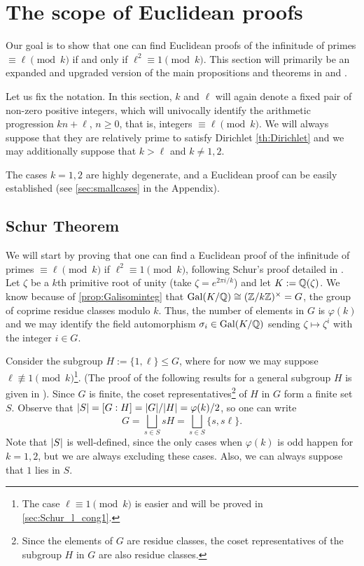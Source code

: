 \documentclass[../main.tex]{subfiles}
\begin{document}
\section{The scope of Euclidean proofs}\label{sec:theoretical}

Our goal is to show that one can find Euclidean proofs of the infinitude of primes $\equiv\ell\pmod{k}$ if and only if $\ell^2\equiv 1 \pmod{k}$. This section will primarily be an expanded and upgraded version of the main propositions and theorems in \cite{Murty} and \cite{Conrad}.

Let us fix the notation. In this section, $k$ and $\ell$ will again denote a fixed pair of non-zero positive integers, which will univocally identify the arithmetic progression $kn+\ell$, $n\geqslant 0$, that is, integers $\equiv \ell\pmod{k}$. We will always suppose that they are relatively prime to satisfy Dirichlet \cref{th:Dirichlet} and we may additionally suppose that $k > \ell$ and $k\neq 1,2$.

\begin{remark}
	The cases $k=1,2$ are highly degenerate, and a Euclidean proof can be easily established (see \cref{sec:smallcases} in the Appendix).
\end{remark}

\subsection{Schur Theorem}\label{sec:SchurTh}

We will start by proving that one can find a Euclidean proof of the infinitude of primes $\equiv \ell\pmod{k}$ if $\ell^2\equiv 1\pmod{k}$, following Schur's proof detailed in \cite{Murty}. Let $\zeta$ be a $k$th primitive root of unity (take $\zeta=e^{2\pi i/k}$) and let $K:=\mathbb{Q}(\zeta)$. We know because of \cref{prop:Galisominteg} that $\operatorname{Gal}(K/\mathbb{Q})\cong (\mathbb{Z}/k\mathbb{Z})^\times=G$, the group of coprime residue classes modulo $k$. Thus, the number of elements in $G$ is $\varphi(k)$ and we may identify the field automorphism $\sigma_i\in\operatorname{Gal}(K/\mathbb{Q})$ sending $\zeta\mapsto\zeta^i$ with the integer $i\in G$.

Consider the subgroup $H:=\{1, \ell\}\leqslant G$, where for now we may suppose $\ell\not\equiv 1 \pmod{k}$\footnote{The case $\ell\equiv1\pmod{k}$ is easier and will be proved in \cref{sec:Schur_l_cong1}.}. (The proof of the following results for a general subgroup $H$ is given in \cite{Murty}). Since $G$ is finite, the coset representatives\footnote{Since the elements of $G$ are residue classes, the coset representatives of the subgroup $H$ in $G$ are also residue classes.} of $H$ in $G$ form a finite set $S$. Observe that $\abs{S}=[G:H]=\abs{G}/\abs{H}=\varphi(k)/2$, so one can write 
\begin{equation}\label{eq:GsplitH}
	G=\bigsqcup_{s\in S}sH=\bigsqcup_{s\in S}\{s, s\ell\}.
\end{equation}
Note that $\abs{S}$ is well-defined, since the only cases when $\varphi(k)$ is odd happen for $k=1, 2$, but we are always excluding these cases. Also, we can always suppose that $1$ lies in $S$.
\end{document}
